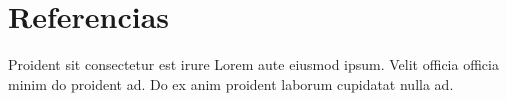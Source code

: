 \section{Referencias}
Proident sit consectetur est irure Lorem aute eiusmod ipsum. Velit officia officia minim do proident ad. Do ex anim proident laborum cupidatat nulla ad.

